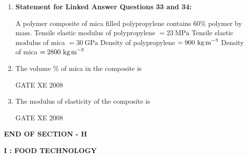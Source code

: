 \documentclass[12pt]{article}
\begin{document}
\begin{enumerate}[label=Q\arabic*.]
\item[]

\textbf{Statement for Linked Answer Questions 33 and 34:}  

A polymer composite of mica filled polypropylene contains $60\%$ polymer by mass.  
Tensile elastic modulus of polypropylene $= 23\ \text{MPa}$  
Tensile elastic modulus of mica $= 30\ \text{GPa}$  
Density of polypropylene $= 900\ \text{kg\,m}^{-3}$  
Density of mica $= 2800\ \text{kg\,m}^{-3}$

\item The volume \% of mica in the composite is  

\begin{enumerate}[label=(\Alph*)]
\end{enumerate}

GATE XE 2008

\item  The modulus of elasticity of the composite is  

\begin{enumerate}[label=(\Alph*)]
\end{enumerate}

GATE XE 2008

\end{enumerate}
\begin{center}
    \textbf{END OF SECTION - H}
\end{center}

 \newpage

\begin{center}
    \textbf{\Large I : FOOD TECHNOLOGY}
\end{center}
\end{document}
